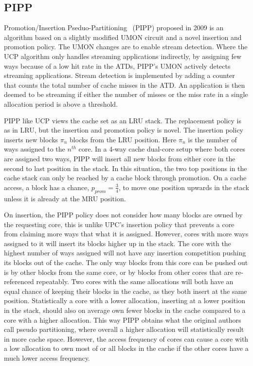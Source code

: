 
\subsection{PIPP}
\label{sec:algorithms:pipp}

Promotion/Insertion Pseduo-Partitioning~\cite{Xie2009} (PIPP) proposed in 2009 is an algorithm based on a slightly modified UMON circuit and a novel insertion and promotion policy.
The UMON changes are to enable stream detection.
Where the UCP algorithm only handles streaming applications indirectly, by assigning few ways because of a low hit rate in the ATDs, PIPP's UMON actively detects streaming applications.
Stream detection is implemented by adding a counter that counts the total number of cache misses in the ATD.
An application is then deemed to be streaming if either the number of misses or the miss rate in a single allocation period is above a threshold.

PIPP like UCP views the cache set as an LRU stack.
The replacement policy is as in LRU, but the insertion and promotion policy is novel.
The insertion policy inserts new blocks $\pi_n$ blocks from the LRU position. 
Here $\pi_n$ is the number of ways assigned to the $n^{th}$ core.
In a 4-way cache dual-core setup where both cores are assigned two ways, PIPP will insert all new blocks from either core in the second to last position in the stack. 
In this situation, the two top positions in the cache stack can only be reached by a cache block through promotion.
On a cache access, a block has a chance, $p_{prom} = \frac{3}{4}$, to move one position upwards in the stack unless it is already at the MRU position.

On insertion, the PIPP policy does not consider how many blocks are owned by the requesting core, this is unlike UPC's insertion policy that prevents a core from claiming more ways that what it is assigned.
However, cores with more ways assigned to it will insert its blocks higher up in the stack. 
The core with the highest number of ways assigned will not have any insertion competition pushing its blocks out of the cache.
The only way blocks from this core can be pushed out is by other blocks from the same core, or by blocks from other cores that are re-referenced repeatably.
Two cores with the same allocations will both have an equal chance of keeping their blocks in the cache, as they both insert at the same position.
Statistically a core with a lower allocation, inserting at a lower position in the stack, should also on average own fewer blocks in the cache compared to a core with a higher allocation.
This way PIPP obtains what the original authors call pseudo partitioning, where overall a higher allocation will statistically result in more cache space.
However, the access frequency of cores can cause a core with a low allocation to own most of or all blocks in the cache if the other cores have a much lower access frequency.

